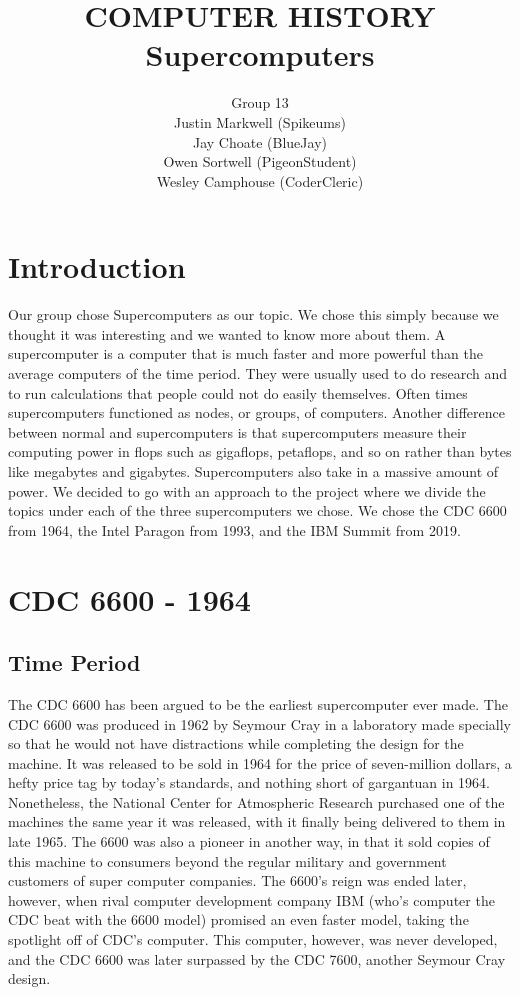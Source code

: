 \documentclass[letterpaper, 10 pt, conference]{IEEEconf}
\title{\LARGE \bf
COMPUTER HISTORY\\
\large Supercomputers
}
\author{Group 13\\
\small Justin Markwell (Spikeums)\\
\small Jay Choate (BlueJay)\\
\small Owen Sortwell (PigeonStudent)\\
\small Wesley Camphouse (CoderCleric)\\
}
\begin{document}
\maketitle
\thispagestyle{empty}
\pagestyle{empty}



\section{Introduction}
Our group chose Supercomputers as our topic. We chose this simply because we thought it was interesting and we wanted to know more about them. A supercomputer is a computer that is much faster and more powerful than the average computers of the time period. They were usually used to do research and to run calculations that people could not do easily themselves. Often times supercomputers functioned as nodes, or groups, of computers. Another difference between normal and supercomputers is that supercomputers measure their computing power in flops such as gigaflops, petaflops, and so on rather than bytes like megabytes and gigabytes. Supercomputers also take in a massive amount of power. We decided to go with an approach to the project where we divide the topics under each of the three supercomputers we chose. We chose the CDC 6600 from 1964, the Intel Paragon from 1993, and the IBM Summit from 2019. 


\section{CDC 6600 - 1964}
\subsection{Time Period}
The CDC 6600 has been argued to be the earliest supercomputer ever made. The CDC 6600 was produced in 1962 by Seymour Cray in a laboratory made specially so that he would not have distractions while completing the design for the machine. It was released to be sold in 1964 for the price of seven-million dollars, a hefty price tag by today's standards, and nothing short of gargantuan in 1964. Nonetheless, the National Center for Atmospheric Research purchased one of the machines the same year it was released, with it finally being delivered to them in late 1965. The 6600 was also a pioneer in another way, in that it sold copies of this machine to consumers beyond the regular military and government customers of super computer companies. The 6600's reign was ended later, however, when rival computer development company IBM (who's computer the CDC beat with the 6600 model) promised an even faster model, taking the spotlight off of CDC's computer. This computer, however, was never developed, and the CDC 6600 was later surpassed by the CDC 7600, another Seymour Cray design.
\end{document}
